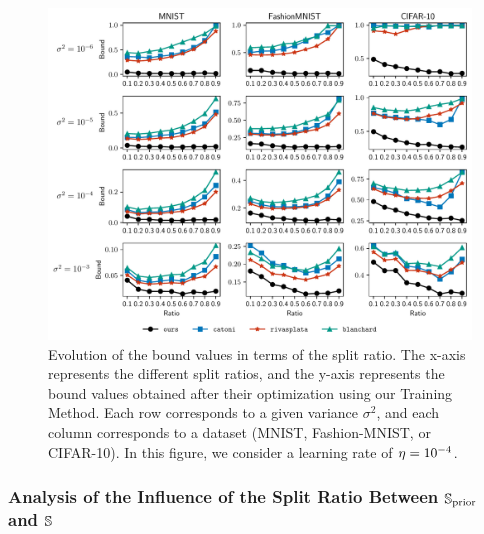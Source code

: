 \begin{figure}
    \centering
    \includegraphics[width=1.0\linewidth]{chapter_6/figures/plot_1_lr_0.0001.pdf}
    \caption[Evolution of the Bound Values in Terms of the Split Ratio (2/2)]{
    Evolution of the bound values in terms of the split ratio. 
    The x-axis represents the different split ratios, and the y-axis represents the bound values obtained after their optimization using our Training Method.
    Each row corresponds to a given variance $\sigma^2$, and each column corresponds to a dataset (MNIST, Fashion-MNIST, or CIFAR-10).
    In this figure, we consider a learning rate of $\lr=10^{-4}$.
    }
    \label{chap:dis-pra:figure:exp-5}
\end{figure}

\subsubsection{Analysis of the Influence of the Split Ratio Between $\S_{\text{prior}}$ and $\S$}

